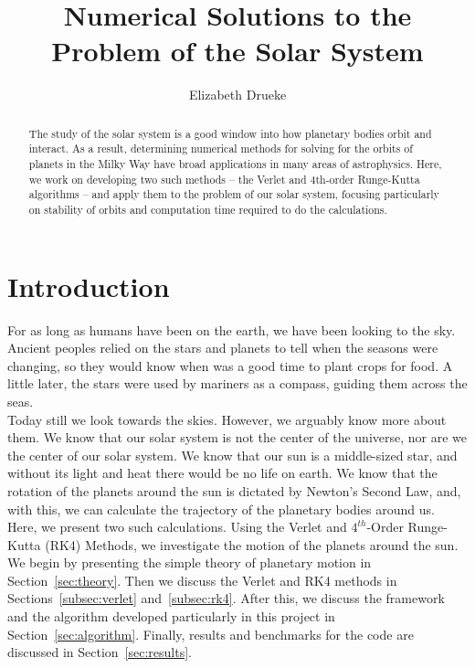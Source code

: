 \documentclass[12pt]{article}
\title{Numerical Solutions to the Problem of the Solar System}
\author{Elizabeth Drueke}
\numberwithin{equation}{section}
\begin{document}
\maketitle

\begin{abstract}
The study of the solar system is a good window into how planetary bodies orbit and interact.  As a result, determining numerical methods for solving for the orbits of planets in the Milky Way have broad applications in many areas of astrophysics.  Here, we work on developing two such methods -- the Verlet and 4th-order Runge-Kutta algorithms -- and apply them to the problem of our solar system, focusing particularly on stability of orbits and computation time required to do the calculations. 
\end{abstract}

\section{Introduction}
\label{sec:intro}

For as long as humans have been on the earth, we have been looking to the sky.  Ancient peoples relied on the stars and planets to tell when the seasons were changing, so they would know when was a good time to plant crops for food.  A little later, the stars were used by mariners as a compass, guiding them across the seas.  
\\\indent Today still we look towards the skies.  However, we arguably know more about them.  We know that our solar system is not the center of the universe, nor are we the center of our solar system.  We know that our sun is a middle-sized star, and without its light and heat there would be no life on earth.  We know that the rotation of the planets around the sun is dictated by Newton's Second Law, and, with this, we can calculate the trajectory of the planetary bodies around us.  
\\\indent Here, we present two such calculations.  Using the Verlet and $4^{th}$-Order Runge-Kutta (RK4) Methods, we investigate the motion of the planets around the sun.  We begin by presenting the simple theory of planetary motion in Section~\ref{sec:theory}.  Then we discuss the Verlet and RK4 methods in Sections~\ref{subsec:verlet} and~\ref{subsec:rk4}.  After this, we discuss the framework and the algorithm developed particularly in this project in Section~\ref{sec:algorithm}.  Finally, results and benchmarks for the code are discussed in Section~\ref{sec:results}.
\end{document}
